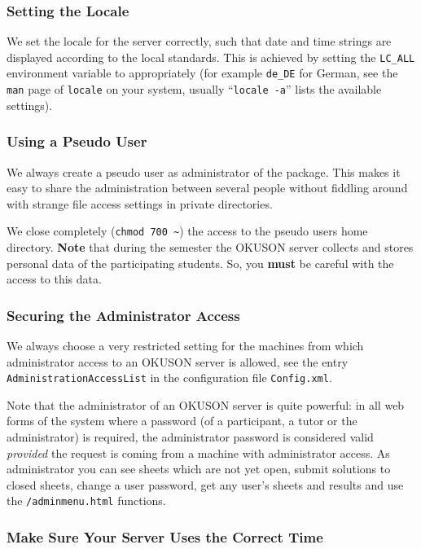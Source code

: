 \documentclass[12pt,openany,a4paper]{book}
\newcommand{\OKUSON}{\textsf{OKUSON}}
\begin{document}
\subsubsection*{Setting the Locale}

We set the locale for the server correctly, such that date and time
strings are displayed according to the local standards. This is
achieved by setting the \verb+LC_ALL+ environment
variable to appropriately (for example \verb+de_DE+ for German, see the
\texttt{man} page of \texttt{locale} on your system, usually ``\texttt{locale
-a}'' lists the available settings).
 
\subsubsection*{Using a Pseudo User}

We always create a pseudo user as administrator of the package. This makes
it easy to share the administration between several people without fiddling
around with strange file access settings in private directories.

We close completely (\verb+chmod 700 ~+) the access to the pseudo users
home directory. \textbf{Note} that during the semester the {\OKUSON}
server collects and stores personal data of the participating students.
So, you \textbf{must} be careful with the access to this data.

\subsubsection*{Securing the Administrator Access}
\label{AdministrationAccessList}
We always choose a very restricted setting for the machines from which 
administrator access to an {\OKUSON} server is allowed, see the entry
\texttt{AdministrationAccessList} in the configuration file
\texttt{Config.xml}. 

Note that the administrator of an {\OKUSON} server is quite powerful:
in all web forms of the system where a password (of a participant, a tutor or
the administrator) is required, the
administrator password is considered valid \emph{provided} the request is
coming from a machine with administrator access. As administrator you can
see sheets which are not yet open, submit solutions to closed sheets, change
a user password, get any user's sheets and results and use the 
\texttt{/adminmenu.html} functions.

\subsubsection*{Make Sure Your Server Uses the Correct Time}
\end{document}
